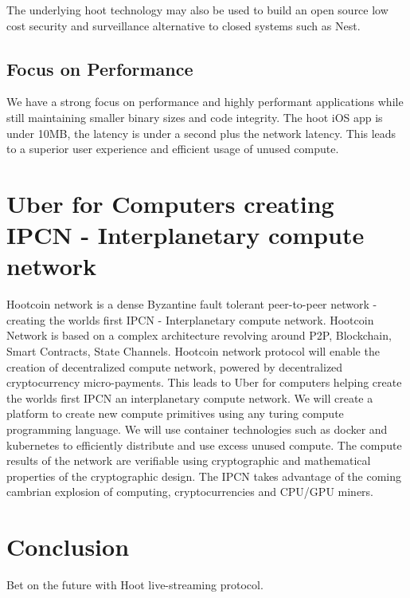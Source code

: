 \documentclass{article}
\begin{document}
The underlying hoot technology may also be used to build an open source low cost security and surveillance alternative to closed systems such as Nest.

\subsection{Focus on Performance}
We have a strong focus on performance and highly performant applications while still maintaining smaller binary sizes and code integrity. The hoot iOS app is under 10MB, the latency is under a second plus the network latency. This leads to a superior user experience and efficient usage of unused compute.

\section{Uber for Computers creating IPCN - Interplanetary compute network}
Hootcoin network is a dense Byzantine fault tolerant peer-to-peer network - creating the worlds first IPCN - Interplanetary compute network. Hootcoin Network is based on a complex architecture revolving around P2P, Blockchain, Smart Contracts, State Channels. Hootcoin network protocol will enable the creation of decentralized compute network, powered by decentralized cryptocurrency micro-payments. This leads to Uber for computers helping create the worlds first IPCN an interplanetary compute network. We will create a platform to create new compute primitives using any turing compute programming language. We will use container technologies such as docker and kubernetes to efficiently distribute and use excess unused compute. The compute results of the network are verifiable using cryptographic and mathematical properties of the cryptographic design. The IPCN takes advantage of the coming cambrian explosion of computing, cryptocurrencies and CPU/GPU miners.


\section{Conclusion}
Bet on the future with Hoot live-streaming protocol.




\newpage
\listoffigures
\newpage 
\listoftables
\newpage 

\end{document}
